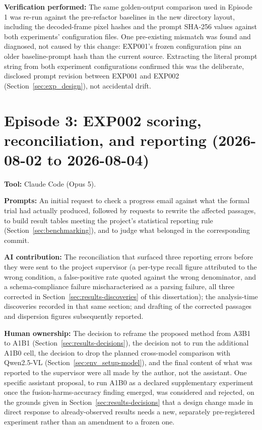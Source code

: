 \textbf{Verification performed:} The same golden-output comparison used in Episode 1 was re-run against the pre-refactor baselines in the new directory layout, including the decoded-frame pixel hashes and the prompt SHA-256 values against both experiments' configuration files. One pre-existing mismatch was found and diagnosed, not caused by this change: EXP001's frozen configuration pins an older baseline-prompt hash than the current source. Extracting the literal prompt string from both experiment configurations confirmed this was the deliberate, disclosed prompt revision between EXP001 and EXP002 (Section~\ref{sec:exp_design}), not accidental drift.

\section{Episode 3: EXP002 scoring, reconciliation, and reporting (2026-08-02 to 2026-08-04)}
\textbf{Tool:} Claude Code (Opus 5).

\textbf{Prompts:} An initial request to check a progress email against what the formal trial had actually produced, followed by requests to rewrite the affected passages, to build result tables meeting the project's statistical reporting rule (Section~\ref{sec:benchmarking}), and to judge what belonged in the corresponding commit.

\textbf{AI contribution:} The reconciliation that surfaced three reporting errors before they were sent to the project supervisor (a per-type recall figure attributed to the wrong condition, a false-positive rate quoted against the wrong denominator, and a schema-compliance failure mischaracterised as a parsing failure, all three corrected in Section~\ref{sec:results-discoveries} of this dissertation); the analysis-time discoveries recorded in that same section; and drafting of the corrected passages and dispersion figures subsequently reported.

\textbf{Human ownership:} The decision to reframe the proposed method from A3B1 to A1B1 (Section~\ref{sec:results-decisions}), the decision not to run the additional A1B0 cell, the decision to drop the planned cross-model comparison with Qwen2.5-VL (Section~\ref{sec:env_setup-model}), and the final content of what was reported to the supervisor were all made by the author, not the assistant. One specific assistant proposal, to run A1B0 as a declared supplementary experiment once the fusion-harms-accuracy finding emerged, was considered and rejected, on the grounds given in Section~\ref{sec:results-decisions} that a design change made in direct response to already-observed results needs a new, separately pre-registered experiment rather than an amendment to a frozen one.

